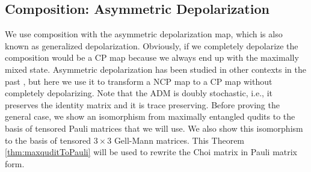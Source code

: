 \documentclass[12pt]{iopart}
\begin{document}
\subsection{Composition: Asymmetric Depolarization}
We use composition with the asymmetric depolarization map, which is also known as generalized depolarization. Obviously, if we completely depolarize the composition would be a CP map because we always end up with the maximally mixed state. Asymmetric depolarization has been studied in other contexts in the past \cite{bowen2001TeleportationDepolarization, Jagadish_2019MeasurePauliMaps, Jagadish_2018InvitationChannels, siudzi2019GeometryPauliMaps}, but here we use it to transform a NCP map to a CP map without completely depolarizing. Note that the ADM is doubly stochastic, i.e., it preserves the identity matrix and it is trace preserving. Before proving the general case, we show an isomorphism from maximally entangled qudits to the basis of tensored Pauli matrices that we will use. We also show this isomorphism to the basis of tensored $3\times 3$ Gell-Mann matrices. This Theorem \ref{thm:maxquditToPauli} will be used to rewrite the Choi matrix in Pauli matrix form.
\end{document}
